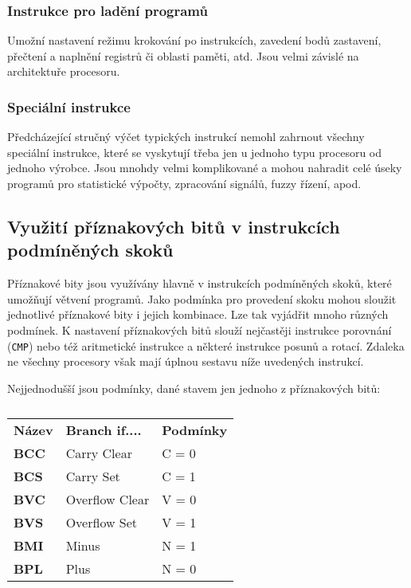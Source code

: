         \subsubsection{Instrukce pro ladění programů}
          Umožní nastavení režimu krokování po instrukcích, zavedení bodů zastavení, přečtení a 
          naplnění registrů či oblasti paměti, atd. Jsou velmi závislé na architektuře procesoru.
          
        \subsubsection{Speciální instrukce} 
          Předcházející stručný výčet typických instrukcí nemohl zahrnout všechny 
          speciální instrukce, které se vyskytují třeba jen u jednoho typu procesoru od jednoho 
          výrobce. Jsou mnohdy velmi komplikované a mohou nahradit celé úseky programů pro 
          statistické výpočty, zpracování signálů, fuzzy řízení, apod.

    \subsection{Využití příznakových bitů v instrukcích podmíněných 
    skoků}\label{ces:IchapIVsecIIssecVII}
      Příznakové bity jsou využívány hlavně v instrukcích podmíněných skoků, které umožňují větvení 
      programů. Jako podmínka pro provedení skoku mohou sloužit jednotlivé příznakové bity i jejich 
      kombinace. Lze tak vyjádřit mnoho různých podmínek. K nastavení příznakových bitů slouží 
      nejčastěji instrukce porovnání (\texttt{CMP}) nebo též aritmetické instrukce a některé 
      instrukce posunů a rotací. Zdaleka ne všechny procesory však mají úplnou sestavu níže 
      uvedených instrukcí.
      
      Nejjednodušší jsou podmínky, dané stavem jen jednoho z příznakových bitů:
      \begin{table}[ht!] 
        \renewcommand\arraystretch{1.0}
        \begin{tabular}{lll}
          \textbf{Název} & \textbf{Branch if....}   & \textbf{Podmínky}   \\ \cline{1-3}
          \textbf{BCC}   & Carry Clear              & C = 0               \\
          \textbf{BCS}   & Carry Set                & C = 1               \\
          \textbf{BVC}   & Overflow Clear           & V = 0               \\
          \textbf{BVS}   & Overflow Set             & V = 1               \\
          \textbf{BMI}   & Minus                    & N = 1               \\
          \textbf{BPL}   & Plus                     & N = 0               \\
        \end{tabular}
        \caption*{ }
      \end{table}
      
